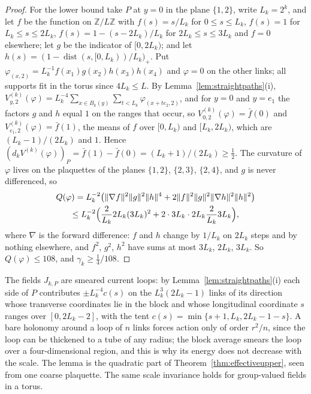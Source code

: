 \documentclass[11pt]{amsart}
\theoremstyle{definition}
\theoremstyle{remark}
\numberwithin{equation}{section}
\newcommand{\Z}{\mathbb{Z}}
\newcommand{\dist}{\operatorname{dist}}
\begin{document}
\begin{proof}
For the lower bound take $P$ at $y=0$ in the plane $\{1,2\}$, write
$L_k=2^k$, and let $f$ be the function on $\Z/L\Z$ with $f(s)=s/L_k$ for
$0\le s\le L_k$, $f(s)=1$ for $L_k\le s\le2L_k$, $f(s)=1-(s-2L_k)/L_k$ for
$2L_k\le s\le3L_k$ and $f=0$ elsewhere; let $g$ be the indicator of
$[0,2L_k)$; and let $h(s)=(1-\dist(s,[0,L_k))/L_k)_+$. Put $\varphi_{(x,2)}
=L_k^{-1}f(x_1)g(x_2)h(x_3)h(x_4)$ and $\varphi=0$ on the other links;
all supports fit in the torus since $4L_k\le L$. By
Lemma~\ref{lem:straightpaths}(i), $V^{(k)}_{y,2}(\varphi)=L_k^{-4}\sum_{x
\in B_k(y)}\sum_{t<L_k}\varphi_{(x+te_2,2)}$, and for $y=0$ and $y=e_1$ the
factors $g$ and $h$ equal $1$ on the ranges that occur, so $V^{(k)}_{0,2}(
\varphi)=\bar f(0)$ and $V^{(k)}_{e_1,2}(\varphi)=\bar f(1)$, the means of
$f$ over $[0,L_k)$ and $[L_k,2L_k)$, which are $(L_k-1)/(2L_k)$ and $1$.
Hence $(d_kV^{(k)}(\varphi))_P=\bar f(1)-\bar f(0)=(L_k+1)/(2L_k)\ge
\frac12$. The curvature of $\varphi$ lives on the plaquettes of the planes
$\{1,2\}$, $\{2,3\}$, $\{2,4\}$, and $g$ is never differenced, so
\begin{multline*}
Q(\varphi)=L_k^{-2}\bigl(\|\nabla f\|^2\|g\|^2\|h\|^4+2\|f\|^2\|g\|^2\|
\nabla h\|^2\|h\|^2\bigr)\\
\le L_k^{-2}\Bigl(\frac2{L_k}2L_k(3L_k)^2+2\cdot3L_k\cdot2L_k\frac2{L_k}
3L_k\Bigr),
\end{multline*}
where $\nabla$ is the forward difference: $f$ and $h$ change by $1/L_k$ on
$2L_k$ steps and by nothing elsewhere, and $f^2$, $g^2$, $h^2$ have sums at
most $3L_k$, $2L_k$, $3L_k$. So $Q(\varphi)\le108$, and $\gamma_k\ge\frac14/108$.
\end{proof}

The fields $J_{k,P}$ are smeared current loops: by
Lemma~\ref{lem:straightpaths}(i) each side of $P$ contributes $\pm L_k^{-4}
c(s)$ on the $L_k^3(2L_k-1)$ links of its direction whose transverse
coordinates lie in the block and whose longitudinal coordinate $s$ ranges
over $[0,2L_k-2]$, with the tent $c(s)=\min\{s+1,L_k,2L_k-1-s\}$. A bare
holonomy around a loop of $n$ links forces action only of order $r^2/n$,
since the loop can be thickened to a tube of any radius; the block average
smears the loop over a four-dimensional region, and this is why its energy
does not decrease with the scale. The lemma is the quadratic part of
Theorem~\ref{thm:effectiveupper}, seen from one coarse plaquette. The
same scale invariance holds for group-valued fields in a torus.
\end{document}
